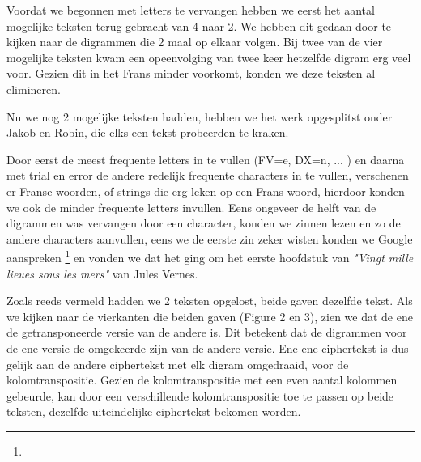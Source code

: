 \documentclass[a4paper,11pt]{article}
\begin{document}
Voordat we begonnen met letters te vervangen hebben we eerst het aantal mogelijke teksten terug gebracht van 4 naar 2. We hebben dit gedaan door te kijken naar de digrammen die 2 maal op elkaar volgen. Bij twee van de vier mogelijke teksten kwam een opeenvolging van twee keer hetzelfde digram erg veel voor. Gezien dit in het Frans minder voorkomt, konden we deze teksten al elimineren.

Nu we nog 2 mogelijke teksten hadden, hebben we het werk opgesplitst onder Jakob en Robin, die elks een tekst probeerden te kraken.

Door eerst de meest frequente letters in te vullen (FV=e, DX=n, ... ) en daarna met trial en error de andere redelijk frequente characters in te vullen, verschenen er Franse woorden, of strings die erg leken op een Frans woord, hierdoor konden we ook de minder frequente letters invullen. Eens ongeveer de helft van de digrammen was vervangen door een character, konden we zinnen lezen en zo de andere characters aanvullen, eens we de eerste zin zeker wisten konden we Google aanspreken \footnote{\googleSearch} en vonden we dat het ging om het eerste hoofdstuk van \textit{"Vingt mille lieues sous les mers"} van Jules Vernes. 

Zoals reeds vermeld hadden we 2 teksten opgelost, beide gaven dezelfde tekst. Als we kijken naar de vierkanten die beiden gaven (Figure 2 en 3), zien we dat de ene de getransponeerde versie van de andere is. Dit betekent dat de digrammen voor de ene versie de omgekeerde zijn van de andere versie. Ene ene ciphertekst is dus gelijk aan de andere ciphertekst met elk digram omgedraaid, voor de kolomtranspositie. Gezien de kolomtranspositie met een even aantal kolommen gebeurde, kan door een verschillende kolomtranspositie toe te passen op beide teksten, dezelfde uiteindelijke ciphertekst bekomen worden.
\end{document}
